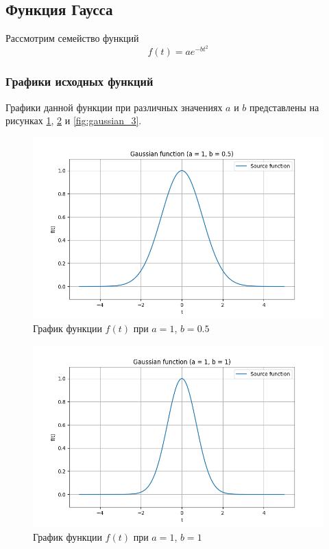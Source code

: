 \subsection{Функция Гаусса}

Рассмотрим семейство функций
\begin{equation}
    f(t) = a e^{-bt^2}
    \label{eq:gaussian_function}
\end{equation}

\subsubsection{Графики исходных функций}
Графики данной функции при различных значениях $a$ и $b$ представлены на рисунках \ref{fig:gaussian_1}, \ref{fig:gaussian_2} и \ref{fig:gaussian_3}.

\begin{figure}[ht!]
    \centering
    \includegraphics[width=\textwidth]{media/gaussian_1.png}
    \caption{График функции $f(t)$ при $a = 1$, $b = 0.5$}
    \label{fig:gaussian_1}
\end{figure}

\begin{figure}[ht!]
    \centering
    \includegraphics[width=\textwidth]{media/gaussian_2.png}
    \caption{График функции $f(t)$ при $a = 1$, $b = 1$}
    \label{fig:gaussian_2}
\end{figure}

